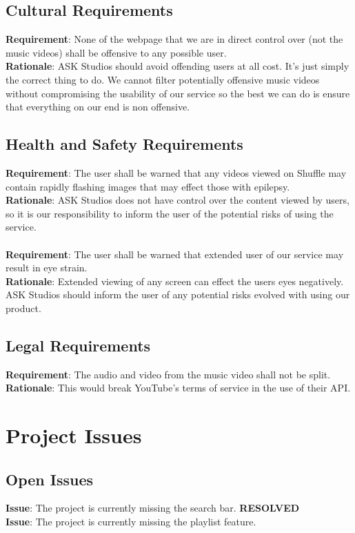 \documentclass[12pt, titlepage]{article}
\begin{document}
\subsection{Cultural Requirements}
\textbf{Requirement}: None of the webpage that we are in direct control over (not the music videos) shall be offensive to any possible user.\\
\textbf{Rationale}: ASK Studios should avoid offending users at all cost. It's just simply the correct thing to do. We cannot filter potentially offensive music videos without compromising the usability of our service so the best we can do is ensure that everything on our end is non offensive.

\subsection{Health and Safety Requirements}
\textbf{Requirement}: The user shall be warned that any videos viewed on Shuffle may contain rapidly flashing images that may effect those with epilepsy.\\
\textbf{Rationale}: ASK Studios does not have control over the content viewed by users, so it is our responsibility to inform the user of the potential risks of using the service.\\\\
\textbf{Requirement}: The user shall be warned that extended user of our service may result in eye strain.\\
\textbf{Rationale}: Extended viewing of any screen can effect the users eyes negatively. ASK Studios should inform the user of any potential risks evolved with using our product.

\subsection{Legal Requirements}
\textbf{Requirement}: The audio and video from the music video shall not be split.\\
\textbf{Rationale}: This would break YouTube's terms of service in the use of their API.

\section{Project Issues}

\subsection{Open Issues}
\textbf{Issue}: The project is currently missing the search bar. \textbf{RESOLVED}\\
\textbf{Issue}: The project is currently missing the playlist feature.
\end{document}
